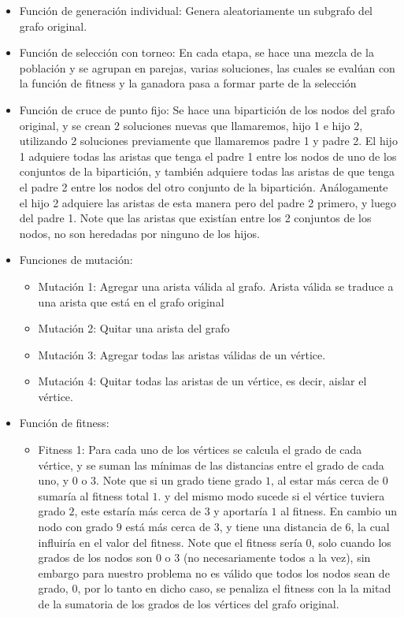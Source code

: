 \documentclass{article}
\begin{document}
\begin{itemize}
	\item Función de generación individual: Genera aleatoriamente un subgrafo del grafo original.
	\item Función de selección con torneo: En cada etapa, se hace una mezcla de la población y se agrupan en parejas, varias soluciones, las cuales se evalúan con la función de fitness y la ganadora pasa a formar parte de la selección
	\item Función de cruce de punto fijo: Se hace una bipartición de los nodos del grafo original, y se crean 2 soluciones nuevas que llamaremos, hijo 1 e hijo 2, utilizando 2 soluciones previamente que llamaremos padre 1 y padre 2. El hijo 1 adquiere todas las aristas que tenga el padre 1 entre los nodos de uno de los conjuntos de la bipartición, y también adquiere todas las aristas de que tenga el padre 2 entre los nodos del otro conjunto de la bipartición. Análogamente el hijo 2 adquiere las aristas de esta manera pero del padre 2 primero, y luego del padre 1. Note que las aristas que existían entre los 2 conjuntos de los nodos, no son heredadas por ninguno de los hijos.
	\item Funciones de mutación:
	\begin{itemize}
		\item Mutación 1: Agregar una arista válida al grafo. Arista válida se traduce a una arista que está en el grafo original
		\item Mutación 2: Quitar una arista del grafo
		\item Mutación 3: Agregar todas las aristas válidas de un vértice.
		\item Mutación 4: Quitar todas las aristas de un vértice, es decir, aislar el vértice. 
	\end{itemize}
	\item Función de fitness:
	\begin{itemize}
		\item Fitness 1: Para cada uno de los vértices se calcula el grado de cada vértice, y se suman las mínimas de las distancias entre el grado de cada uno, y $0$ o $3$. Note que si un grado tiene grado $1$, al estar más cerca de $0$ sumaría al fitness total $1$. y del mismo modo sucede si el vértice tuviera grado $2$, este estaría más cerca de $3$ y aportaría $1$ al fitness. En cambio un nodo con grado $9$ está más cerca de $3$, y tiene una distancia de $6$, la cual influiría en el valor del fitness. Note que el fitness sería $0$, solo cuando los grados de los nodos son $0$ o $3$ (no necesariamente todos a la vez), sin embargo para nuestro problema no es válido que todos los nodos sean de grado, $0$, por lo tanto en dicho caso, se penaliza el fitness con la la mitad de la sumatoria de los grados de los vértices del grafo original.

\end{itemize}
\end{itemize}
\end{document}
